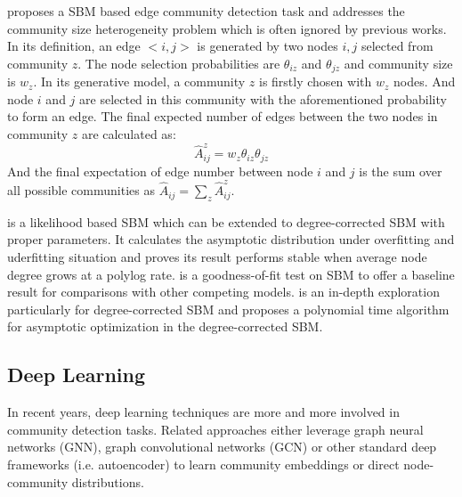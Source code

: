 \cite{he2015stochastic} proposes a SBM based edge community detection task and addresses the community size heterogeneity problem which is often ignored by previous works. In its definition,  an edge $<i,j>$ is generated by two nodes  $i,j$ selected from community $z$. The node selection probabilities are $\theta_{iz}$ and $\theta_{jz}$ and  community size is $w_z$. In its generative model, a community $z$ is firstly chosen with $w_z$ nodes. And node $i$ and $j$ are selected in this community with the aforementioned probability to form an edge. The final expected number of edges between the two nodes in community $z$ are calculated as:
\begin{equation}
\hat{A}^z_{ij} = w_z\theta_{iz}\theta_{jz}
\end{equation}
And the final expectation of edge number between node $i$ and $j$ is the sum over all possible communities as $\hat{A}_{ij} = \sum_{z}\hat{A}^z_{ij}$.


\cite{wang2017likelihood} is a likelihood based SBM  which can be extended to degree-corrected SBM with proper parameters. It calculates the asymptotic distribution under overfitting and uderfitting situation and proves its result performs stable when average node degree grows  at a polylog rate.  \cite{lei2016goodness} is a goodness-of-fit test on SBM to offer a baseline result for comparisons with other competing models. \cite{gao2018community} is an in-depth exploration particularly for degree-corrected SBM and proposes a polynomial time algorithm for asymptotic optimization in  the degree-corrected SBM. 


%


\subsection{Deep Learning}

In recent years, deep learning techniques are more and more involved in community detection tasks. Related approaches either leverage graph neural networks (GNN), graph convolutional networks (GCN) or other standard deep frameworks (i.e. autoencoder) to learn community embeddings or direct node-community distributions. 

